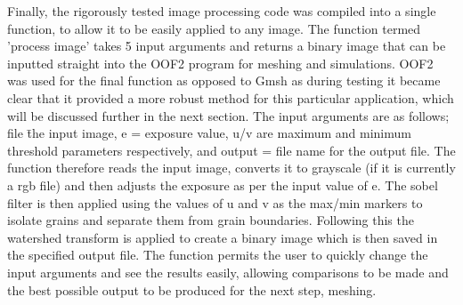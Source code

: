 \documentclass[\report.tex]{subfiles}
\begin{document}
\noindent Finally, the rigorously tested image processing code was compiled into a single function, to allow it to be easily applied to any image. The function termed 'process image' takes 5 input arguments and returns a binary image that can be inputted straight into the OOF2 program for meshing and simulations. OOF2 was used for the final function as opposed to Gmsh as during testing it became clear that it provided a more robust method for this particular application, which will be discussed further in the next section. The input arguments are as follows; file \= the input image, e = exposure value, u/v are maximum and minimum threshold parameters respectively, and output = file name for the output file. The function therefore reads the input image, converts it to grayscale (if it is currently a rgb file) and then adjusts the exposure as per the input value of e. The sobel filter is then applied using the values of u and v as the max/min markers to isolate grains and separate them from grain boundaries. Following this the watershed transform is applied to create a binary image which is then saved in the specified output file. The function permits the user to quickly change the input arguments and see the results easily, allowing comparisons to be made and the best possible output to be produced for the next step, meshing.
\end{document}
